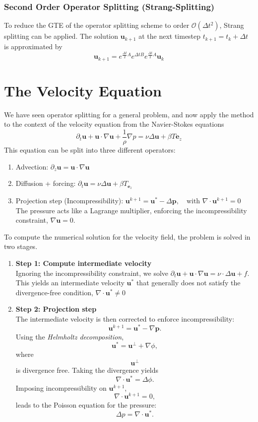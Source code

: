 \subsubsection{Second Order Operator Splitting (Strang-Splitting)}
To reduce the GTE of the operator splitting scheme to order
$\mathcal{O}(\Delta t^2)$, Strang splitting can be applied. The solution
$\bm{u}_{k+1}$ at the next timestep $t_{k+1}=t_k +\Delta t$ is
approximated by
\begin{equation}
    \bm{u}_{k+1}=e^{\frac{\Delta t}{2}A} e^{\Delta t B}
        e^{\frac{\Delta t}{2}A} \bm{u}_k
\end{equation}

\section{The Velocity Equation}
We have seen operator splitting for a general problem, and now apply the
method to the context of the velocity equation from the Navier-Stokes
equations
$$ \partial_t \bm{u} + \bm{u} \cdot \nabla \bm u + \frac{1}{\rho}\nabla p
= \nu \Delta \bm{u} + \beta T\bm{e}_z $$
This equation can be split into three different operators:
\begin{enumerate}
    \item{Advection: $\partial_z \bm{u} = \bm{u}\cdot \nabla \bm{u}$}
    \item {Diffusion + forcing: $\partial_t \bm {u} = \nu \Delta \bm{u}
            + \beta T_{\bm{e}_z}$}
    \item {Projection step (Incompressibility): $\bm{u}^{k+1}= \bm{u}^*-
            \Delta \bm{p}, \quad \text{with } \nabla \cdot \bm{u}^{k+1}=0$
             \\ The pressure acts like a Lagrange multiplier, enforcing
             the incompressibility constraint, $\nabla \bm{u}=0.$}
    
\end{enumerate}
To compute the numerical solution for the velocity field, the problem is
solved in two stages.
\begin{enumerate}
    \item{\textbf{Step 1: Compute intermediate velocity} \\ Ignoring the
        incompressibility constraint, we solve $\partial_t \bm{u}+\bm{u}
        \cdot \nabla \bm{u} = \nu \cdot \Delta \bm{u} + f$. This yields an
        intermediate velocity $\bm u^*$ that generally does not satisfy
        the divergence-free condition, $\nabla \cdot \bm u^* \neq 0$}
    
    \item{\textbf{Step 2: Projection step} \\ The intermediate velocity is
    then corrected to enforce incompressibility: $$ \bm{u}^{k+1} = 
    \bm{u}^*-\nabla \bm{p}.$$ Using the \textit{Helmholtz decomposition},
    $$\bm{u}^* = \bm{u}^\perp + \nabla \phi,$$ where $$\bm{u}^{\perp}$$ is
    divergence free. Taking the divergence yields $$\nabla \cdot \bm{u}^* 
    = \Delta \phi.$$ Imposing incompressibility on $\bm{u}^{k+1}$, 
    $$\nabla \cdot \bm{u}^{k+1} = 0,$$ leads to the Poisson equation for
    the pressure: $$\Delta p = \nabla \cdot \bm{u}^*.$$}
\end{enumerate}

